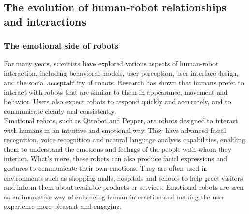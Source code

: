 \subsection{The evolution of human-robot relationships and interactions}
\subsubsection{The emotional side of robots}
For many years, scientists have explored various aspects of human-robot interaction, including behavioral models, user perception, user interface design, and the social acceptability of robots. Research has shown that humans prefer to interact with robots that are similar to them in appearance, movement and behavior. Users also expect robots to respond quickly and accurately, and to communicate clearly and consistently.\\
Emotional robots, such as Qtrobot and Pepper, are robots designed to interact with humans in an intuitive and emotional way. They have advanced facial recognition, voice recognition and natural language analysis capabilities, enabling them to understand the emotions and feelings of the people with whom they interact. What's more, these robots can also produce facial expressions and gestures to communicate their own emotions. They are often used in environments such as shopping malls, hospitals and schools to help greet visitors and inform them about available products or services. Emotional robots are seen as an innovative way of enhancing human interaction and making the user experience more pleasant and engaging.\\

